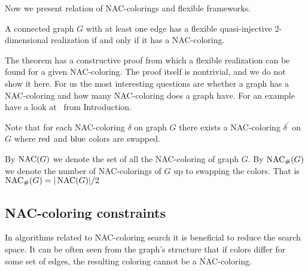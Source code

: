 Now we present relation of NAC-colorings and flexible frameworks.
%
\begin{theorem}
	A connected graph \( G \) with at least one edge has a flexible
	quasi-injective \( 2 \)-dimensional realization if and only if it has a NAC-coloring.
\end{theorem}
%
The theorem has a constructive proof from which a flexible realization
can be found for a given NAC-coloring.
The proof itself is nontrivial, and we do not show it here.
For us the most interesting questions are whether a graph has a NAC-coloring
and how many NAC-coloring does a graph have.
For an example have a look at~
from Introduction.

Note that for each NAC-coloring \( \delta \) on graph \( G \)
there exists a NAC-coloring \( \delta^\prime \) on \( G \)
where \( \text{red} \) and \( \text{blue} \) colors are swapped.
%
\begin{definition}
	By \( \operatorname{NAC}(G) \) we denote the set of all the NAC-coloring of graph \( G \).
	By \( \operatorname{NAC}_{\#} (G) \) we denote the number of NAC-colorings of \( G \)
	up to swapping the colors.
	That is \( \operatorname{NAC}_{\#} (G) = | \operatorname{NAC}(G) | / 2 \)
\end{definition}
%

\subsection{NAC-coloring constraints}

In algorithms related to NAC-coloring search it is beneficial
to reduce the search space.
It can be often seen from the graph's structure
that if colors differ for some set of edges,
the resulting coloring cannot be a NAC-coloring.

